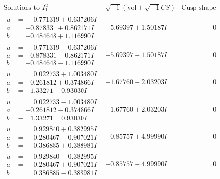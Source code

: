 \documentclass[1p]{elsarticle_modified}
\theoremstyle{definition}
\newcommand{\I}{\sqrt{-1}}
\begin{document}
$$\begin{array}{c|c|c}  
\text{Solutions to }I^u_{1}& \I (\text{vol} + \sqrt{-1}CS) & \text{Cusp shape}\\
 \hline 
\begin{aligned}
u &= \phantom{-}0.771319 + 0.637206 I \\
a &= -0.878331 + 0.862171 I \\
b &= -0.484648 + 1.116990 I\end{aligned}
 & -5.69397 + 1.50187 I & \phantom{-0.000000 } 0 \\ \hline\begin{aligned}
u &= \phantom{-}0.771319 - 0.637206 I \\
a &= -0.878331 - 0.862171 I \\
b &= -0.484648 - 1.116990 I\end{aligned}
 & -5.69397 - 1.50187 I & \phantom{-0.000000 } 0 \\ \hline\begin{aligned}
u &= \phantom{-}0.022733 + 1.003480 I \\
a &= -0.261812 + 0.374866 I \\
b &= -1.33271 + 0.93030 I\end{aligned}
 & -1.67760 - 2.03203 I & \phantom{-0.000000 } 0 \\ \hline\begin{aligned}
u &= \phantom{-}0.022733 - 1.003480 I \\
a &= -0.261812 - 0.374866 I \\
b &= -1.33271 - 0.93030 I\end{aligned}
 & -1.67760 + 2.03203 I & \phantom{-0.000000 } 0 \\ \hline\begin{aligned}
u &= \phantom{-}0.929840 + 0.382995 I \\
a &= \phantom{-}0.280467 - 0.907021 I \\
b &= \phantom{-}0.386885 + 0.388981 I\end{aligned}
 & -0.85757 + 4.99990 I & \phantom{-0.000000 } 0 \\ \hline\begin{aligned}
u &= \phantom{-}0.929840 - 0.382995 I \\
a &= \phantom{-}0.280467 + 0.907021 I \\
b &= \phantom{-}0.386885 - 0.388981 I\end{aligned}
 & -0.85757 - 4.99990 I & \phantom{-0.000000 } 0 \\ \hline\begin{aligned}

\end{aligned}
\end{array}$$
\end{document}
